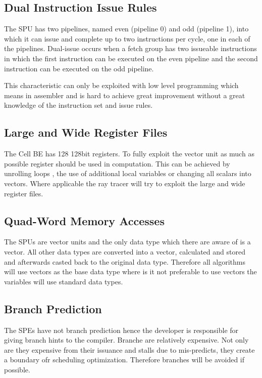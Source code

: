 \documentclass[DIV10, abstracton, openright, footsepline, headsepline, twoside, 9pt,
bigheadings]{scrreprt}
\begin{document}
\subsection{Dual Instruction Issue Rules}
\label{sec:dualissue}
The SPU has two pipelines, named even (pipeline 0) and odd (pipeline 1),
into which it can issue and complete up to two instructions per cycle, one in
each of the pipelines. Dual-issue occurs when a fetch group has two issueable
instructions in which the first instruction can be executed on the even
pipeline and the second instruction can be executed on the odd pipeline.

This characteristic can only be exploited with low level programming which
means in assembler and is hard to achieve great improvement without
a great knowledge of the instruction set and issue rules.


\subsection{Large and Wide Register Files}
\label{sec:register}
The Cell BE has 128 128bit registers. To fully exploit the vector unit
as much as possible register should be used in computation. This can be
achieved by unrolling loops , the use of additional local variables or
changing all scalars into vectors. Where applicable the ray tracer
will try to exploit the large and wide register files.

\subsection{Quad-Word Memory Accesses}
\label{sec:quad}
The SPUs are vector units and the only data type which there are aware of is a
vector. All other data types are converted into a vector, calculated and
stored and afterwards casted back to the original data type. Therefore
all algorithms will use vectors as the base data type where is it not
preferable to use vectors the variables will use standard data types.


\subsection{Branch Prediction}
\label{sec:branch}
The SPEs have not branch prediction hence the developer is responsible for
giving branch hints to the compiler. Branche are relatively expensive. Not
only are they expensive from their issuance and stalls due to mis-predicts,
they create a boundary ofr scheduling optimization. Therefore branches
will be avoided if possible.
\end{document}
